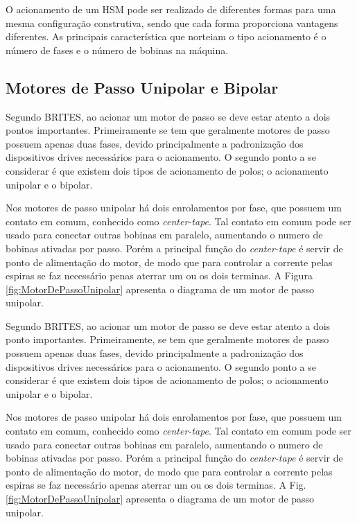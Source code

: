 O acionamento de um HSM pode ser realizado de diferentes formas para uma mesma configuração construtiva, sendo que cada forma proporciona vantagens diferentes. As principais característica que norteiam o tipo acionamento  é o número de  fases e o número de bobinas na máquina.

\subsection{Motores de Passo Unipolar e Bipolar}

Segundo BRITES\cite{PETele}, ao acionar um motor de passo se deve estar atento a dois pontos importantes. Primeiramente se tem que geralmente motores de passo possuem apenas duas fases, devido principalmente a padronização dos dispositivos drives necessários para o acionamento. O segundo ponto a se considerar é que existem dois tipos de acionamento de polos; o acionamento unipolar e o bipolar.  

Nos motores de passo unipolar há dois enrolamentos por fase, que possuem um contato em comum, conhecido como \emph{center-tape}. Tal contato em comum pode ser usado para conectar outras bobinas em paralelo, aumentando o numero de bobinas ativadas por passo. Porém a principal função do \emph{center-tape} é servir de ponto de alimentação do motor, de modo que para controlar a corrente pelas espiras se faz necessário penas aterrar um ou os dois terminas. A Figura \ref{fig:MotorDePassoUnipolar} apresenta o diagrama de um motor de passo unipolar. 

Segundo BRITES\cite{PETele}, ao acionar um motor de passo se deve estar atento a dois ponto importantes. Primeiramente, se tem que geralmente motores de passo possuem apenas duas fases, devido principalmente a padronização dos dispositivos drives necessários para o acionamento. O segundo ponto a se considerar é que existem dois tipos de acionamento de polos; o acionamento unipolar e o bipolar.  

Nos motores de passo unipolar há dois enrolamentos por fase, que possuem um contato em comum, conhecido como \emph{center-tape}. Tal contato em comum pode ser usado para conectar outras bobinas em paralelo, aumentando o numero de bobinas ativadas por passo. Porém a principal função do \emph{center-tape} é servir de ponto de alimentação do motor, de modo que para controlar a corrente pelas espiras se faz necessário apenas aterrar um ou os dois terminas. A Fig. \ref{fig:MotorDePassoUnipolar} apresenta o diagrama de um motor de passo unipolar. 

